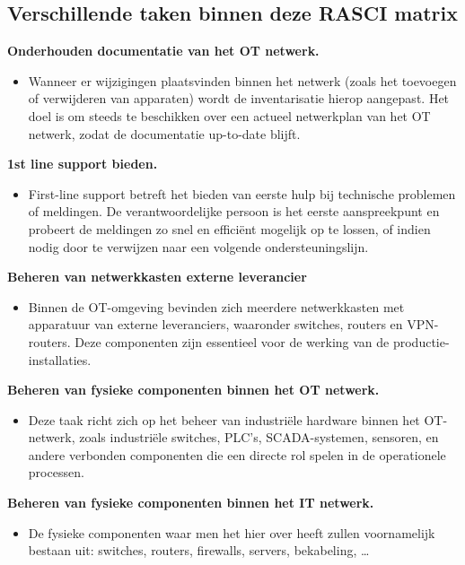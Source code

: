 \subsection{Verschillende taken binnen deze RASCI matrix}

\textbf{Onderhouden documentatie van het OT netwerk.}
\begin{itemize}[label=\textbullet]
    \item Wanneer er wijzigingen plaatsvinden binnen het netwerk (zoals het toevoegen of verwijderen van apparaten) wordt de inventarisatie hierop aangepast. Het doel is om steeds te beschikken over een actueel netwerkplan van het OT netwerk, zodat de documentatie up-to-date blijft. 
\end{itemize}

\textbf{1st line support bieden.}
\begin{itemize}[label=\textbullet]
    \item  First-line support betreft het bieden van eerste hulp bij technische problemen of meldingen. De verantwoordelijke persoon is het eerste aanspreekpunt en probeert de meldingen zo snel en efficiënt mogelijk op te lossen, of indien nodig door te verwijzen naar een volgende ondersteuningslijn.
\end{itemize}

\textbf{Beheren van netwerkkasten externe leverancier}
\begin{itemize}[label=\textbullet]
    \item Binnen de OT-omgeving bevinden zich meerdere netwerkkasten met apparatuur van externe leveranciers, waaronder switches, routers en VPN-routers. Deze componenten zijn essentieel voor de werking van de productie-installaties. 
\end{itemize}

\textbf{Beheren van fysieke componenten binnen het OT netwerk.}
\begin{itemize}[label=\textbullet]
    \item Deze taak richt zich op het beheer van industriële hardware binnen het OT-netwerk, zoals industriële switches, PLC’s, SCADA-systemen, sensoren, en andere verbonden componenten die een directe rol spelen in de operationele processen.
\end{itemize}


\textbf{Beheren van fysieke componenten binnen het IT netwerk.}
\begin{itemize}[label=\textbullet]
    \item De fysieke componenten waar men het hier over heeft zullen voornamelijk bestaan uit: switches, routers, firewalls, servers, bekabeling, …
\end{itemize}

